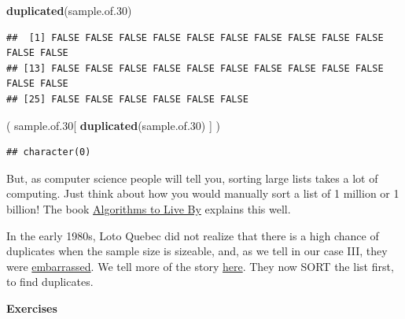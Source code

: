 \documentclass[]{book}
\newenvironment{Shaded}{\begin{snugshade}}{\end{snugshade}}
\newcommand{\FloatTok}[1]{\textcolor[rgb]{0.00,0.00,0.81}{#1}}
\newcommand{\KeywordTok}[1]{\textcolor[rgb]{0.13,0.29,0.53}{\textbf{#1}}}
\newcommand{\NormalTok}[1]{#1}
\begin{document}
\begin{Shaded}
\begin{Highlighting}[]
\KeywordTok{duplicated}\NormalTok{(sample.of}\FloatTok{.30}\NormalTok{)}
\end{Highlighting}
\end{Shaded}

\begin{verbatim}
##  [1] FALSE FALSE FALSE FALSE FALSE FALSE FALSE FALSE FALSE FALSE FALSE FALSE
## [13] FALSE FALSE FALSE FALSE FALSE FALSE FALSE FALSE FALSE FALSE FALSE FALSE
## [25] FALSE FALSE FALSE FALSE FALSE FALSE
\end{verbatim}

\begin{Shaded}
\begin{Highlighting}[]
\NormalTok{( sample.of}\FloatTok{.30}\NormalTok{[ }\KeywordTok{duplicated}\NormalTok{(sample.of}\FloatTok{.30}\NormalTok{) ] )}
\end{Highlighting}
\end{Shaded}

\begin{verbatim}
## character(0)
\end{verbatim}

But, as computer science people will tell you, sorting large lists takes a lot of computing. Just think about how you would manually sort a list of 1 million or 1 billion! The book
\href{https://www.audible.ca/fr_CA/pd/Algorithms-to-Live-By-Livre-Audio/B0711GFR5F?qid=1587911410\&sr=1-1\&ref=a_fr-CA_sea_c3_lProduct_1_1\&pf_rd_p=65c74350-6dfb-47fa-85fd-1459a4762abd\&pf_rd_r=40KVQ9NQZ0W4702QDX6E}{Algorithms to Live By} explains this well.

In the early 1980s, Loto Quebec did not realize that there is a high chance of duplicates when the sample size is sizeable, and, as we tell in our case III, they were \href{http://www.medicine.mcgill.ca/epidemiology/hanley/Reprints/LotteriesProbabilitiesHANLEY1984TeachingStatistics.pdf\#page=4}{embarrassed}.
We tell more of the story \href{http://www.medicine.mcgill.ca/epidemiology/hanley/BionanoWorkshop/coincidencesEXAMPLES.pdf\#page=11}{here}. They now SORT the list first, to find duplicates.

\textbf{Exercises}
\end{document}
